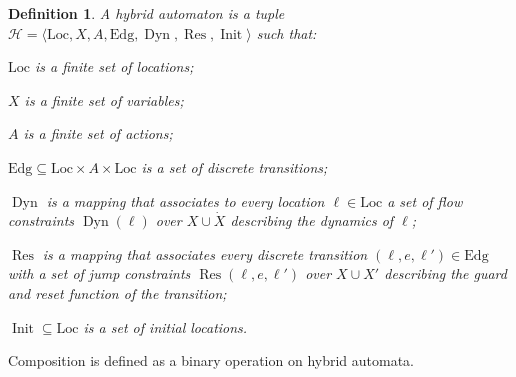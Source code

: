 \documentclass[submission,copyright,creativecommons]{eptcs}
\newtheorem{definition}{Definition}
\newcommand{\autH}{\mathcal{H}}
\newcommand{\Loc}{\mathrm{Loc}}
\newcommand{\Edg}{\mathrm{Edg}}
\DeclareMathOperator{\Dyn}{{Dyn}}
\DeclareMathOperator{\Res}{{Res}}
\DeclareMathOperator{\Init}{{Init}}
\begin{document}
\begin{definition}\label{def:ha-syntax}
   A \emph{hybrid automaton} is a tuple $\autH=\langle\Loc,X,A,\Edg,\Dyn,\Res,\Init\rangle$ such that:
   
   \begin{compactenum}
   	\item $\Loc$ is a finite set of \emph{locations};
   	\item $X$ is a finite set of \emph{variables};
		\item $A$ is a finite set of \emph{actions};
		\item $\Edg \subseteq \Loc \times A \times \Loc$ is a set of \emph{discrete transitions};
		\item $\Dyn$ is a mapping that associates to every location $\ell \in \Loc$ a set of flow constraints $\Dyn(\ell)$ over $X \cup \dot{X}$ describing the \emph{dynamics} of $\ell$;
		\item $\Res$ is a mapping that associates every discrete transition $(\ell,e,\ell') \in \Edg$ with a set of jump constraints $\Res(\ell,e,\ell')$ over $X \cup X'$ describing the guard and reset function of the transition;
		\item $\Init \subseteq \Loc$ is a set of \emph{initial locations}.
\end{compactenum}
\end{definition}


Composition is defined as a binary operation on hybrid automata. 
\end{document}
